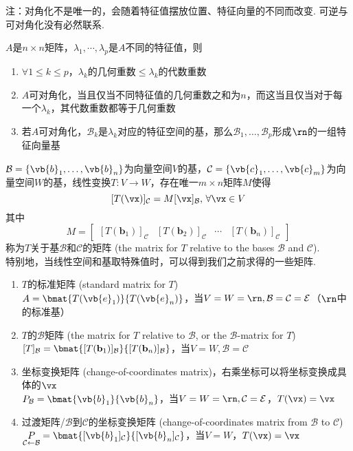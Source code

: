 注：对角化不是唯一的，会随着特征值摆放位置、特征向量的不同而改变. 可逆与可对角化没有必然联系.
\begin{theorem}
$A$是$n\times n$矩阵，$\lambda_1,\cdots,\lambda_p$是$A$不同的特征值，则
\begin{enumerate}
	\itemsep -3pt
	\item $\forall 1\leq k\leq p$，$\lambda_k$的几何重数$\leq\lambda_k$的代数重数
	\item $A$可对角化，当且仅当不同特征值的几何重数之和为$n$，而这当且仅当对于每一个$\lambda_k$，其代数重数都等于几何重数
	\item 若$A$可对角化，$\mathcal{B}_k$是$\lambda_k$对应的特征空间的基，那么$\mathcal{B}_1,\dots,\mathcal{B}_p$形成$\rn$的一组特征向量基
\end{enumerate}
\end{theorem}
\begin{theorem}[线性变换矩阵]
\label{linear_trans_tot}
$\mathcal{B}=\{\vb{b}_1,\dots,\vb{b}_n\}$为向量空间$V$的基，$\mathcal{C}=\{\vb{c}_1,\dots,\vb{c}_m\}$为向量空间$W$的基，线性变换$T:V\to W$，存在唯一$m\times n$矩阵$M$使得
\[[T(\vx)]_\mathcal{C}=M[\vx]_\mathcal{B},\,\forall\vx\in V\]
其中
\[M=\begin{bmatrix}[T(\mathbf{b}_1)]_\mathcal{C}&[T(\mathbf{b}_2)]_\mathcal{C}&\cdots&[T(\mathbf{b}_n)]_\mathcal{C}\end{bmatrix}\]
称为$T$关于基$\mathcal{B}$和$\mathcal{C}$的矩阵 (the matrix for $T$ relative to the bases $\mathcal{B}$ and $\mathcal{C}$).\\
特别地，当线性空间和基取特殊值时，可以得到我们之前求得的一些矩阵.
\begin{enumerate}
	\itemsep -1pt
	\item $T$的标准矩阵 (standard matrix for $T$)\\
	$A=\bmat{T(\vb{e}_1)}{T(\vb{e}_n)}$，当$V=W=\rn,\mathcal{B}=\mathcal{C}=\mathcal{E}$（$\rn$中的标准基）
	\item $T$的$\mathcal{B}$矩阵 (the matrix for $T$ relative to $\mathcal{B}$, or the $\mathcal{B}$-matrix for $T$)\\
	$[T]_{\mathcal{B}}=\bmat{[T(\mathbf{b}_1)]_\mathcal{B}}{[T(\mathbf{b}_n)]_\mathcal{B}}$，当$V=W,\mathcal{B}=\mathcal{C}$
	\item 坐标变换矩阵 (change-of-coordinates matrix)，右乘坐标可以将坐标变换成具体的$\vx$\\
	$P_\mathcal{B}=\bmat{\vb{b}_1}{\vb{b}_n}$，当$V=W=\rn,\mathcal{C}=\mathcal{E}$，$T(\vx)=\vx$
	\item 过渡矩阵/$\mathcal{B}$到$\mathcal{C}$的坐标变换矩阵 (change-of-coordinates matrix from $\mathcal{B}$ to $\mathcal{C}$)\\
	$\underset{\mathcal{C}\gets \mathcal{B}}{P}=\bmat{[\vb{b}_1]_{\mathcal{C}}}{[\vb{b}_n]_{\mathcal{C}}}$，当$V=W$，$T(\vx)=\vx$
\end{enumerate}
\end{theorem}
